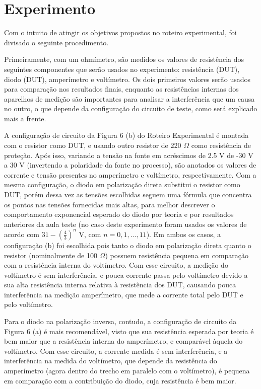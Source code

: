 \section{Experimento}
Com o intuito de atingir os objetivos propostos no roteiro experimental, foi divisado o seguinte procedimento.

Primeiramente, com um ohmímetro, são medidos os valores de resistência dos seguintes componentes que serão usados no experimento: resistência (DUT), diodo (DUT), amperímetro e voltímetro. Os dois primeiros valores serão usados para comparação nos resultados finais, enquanto as resistências internas dos aparelhos de medição são importantes para analisar a interferência que um causa no outro, o que depende da configuração do circuito de teste, como será explicado mais a frente. 

A configuração de circuito da Figura 6 (b) do Roteiro Experimental é montada com o resistor como DUT, e usando outro resistor de 220 $\Omega$ como resistência de proteção. Após isso, variando a tensão na fonte em acréscimos de 2.5 V de -30 V a 30 V (invertendo a polaridade da fonte no processo), são anotados os valores de corrente e tensão presentes no amperímetro e voltímetro, respectivamente. Com a mesma configuração, o diodo em polarização direta substitui o resistor como DUT, porém dessa vez as tensões escolhidas seguem uma fórmula que concentra os pontos nas tensões fornecidas mais altas, para melhor descrever o comportamento exponencial esperado do diodo por teoria e por resultados anteriores da aula teste (no caso deste experimento foram usados os valores de acordo com $31-\left(\frac{4}{3}\right)^n$ V, com $n=0,1,...,11$). Em ambos os casos, a configuração (b) foi escolhida pois tanto o diodo em polarização direta quanto o resistor (nominalmente de 100 $\Omega$) possuem resistência pequena em comparação com a resistência interna do voltímetro. Com esse circuito, a medição do voltímetro é sem interferência, e pouca corrente passa pelo voltímetro devido a sua alta resistência interna relativa à resistência dos DUT, causando pouca interferência na medição amperímetro, que mede a corrente total pelo DUT e pelo voltímetro.

Para o diodo na polarização inversa, contudo, a configuração de circuito da Figura 6 (a) é mais recomendável, visto que sua resistência esperada por teoria é bem maior que a resistência interna do amperímetro, e comparável àquela do voltímetro. Com esse circuito, a corrente medida é sem interferência, e a interferência na medida do voltímetro, que depende da resistência do amperímetro (agora dentro do trecho em paralelo com o voltímetro), é pequena em comparação com a contribuição do diodo, cuja resistência é bem maior.

